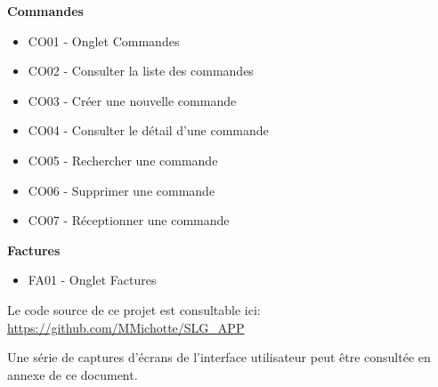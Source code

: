 \newpara
\textbf{Commandes}
\begin{itemize}
  \item \checkmark CO01 - Onglet Commandes
  \item \checkmark CO02 - Consulter la liste des commandes
  \item \checkmark CO03 - Créer une nouvelle commande
  \item \checkmark CO04 - Consulter le détail d'une commande
  \item \checkmark CO05 - Rechercher une commande
  \item \checkmark CO06 - Supprimer une commande
  \item \checkmark CO07 - Réceptionner une commande
\end{itemize}

\newpara
\textbf{Factures}
\begin{itemize}
  \item \checkmark FA01 - Onglet Factures
\end{itemize}

\newpara

Le code source de ce projet est consultable ici: \url{https://github.com/MMichotte/SLG_APP}

\newpara
Une série de captures d'écrans de l'interface utilisateur peut être consultée en annexe de ce document.